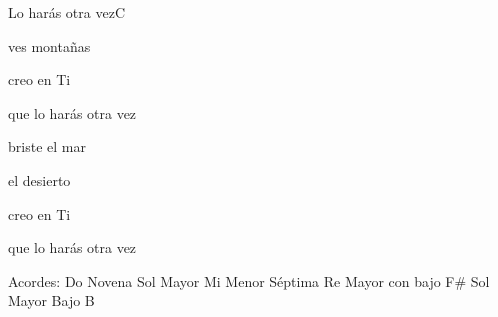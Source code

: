 \documentclass[12pt, spanish]{book}
\begin{document}
\begin{song}{Lo harás otra vez}{C}
\begin{SBOpGroup}
        ves montañas

         creo en Ti

         que lo harás otra vez

        briste el mar

         el desierto

         creo en Ti

         que lo harás otra vez
    \end{SBOpGroup}

    \ifChordBk
    \begin{SBOpGroup}
        Acordes:
        \upchord{\Cnine}\qquad Do Novena \hfill
        \upchord{\G}\qquad Sol Mayor \hfill\null\break
        \upchord{\Emseven}\qquad Mi Menor S\'eptima \hfill
        \upchord{\DFs}\qquad Re Mayor con bajo F\# \hfill\null\break
        \upchord{\GB}Sol Mayor Bajo B \hfill\null\break
    \end{SBOpGroup}
    \fi
\end{song}
\end{document}
